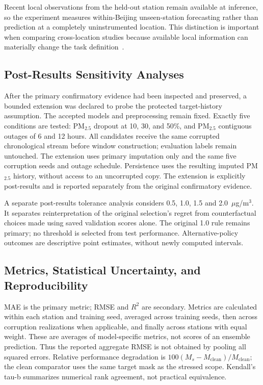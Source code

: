 \documentclass[journal]{IEEEtran}
\begin{document}
Recent local observations from the held-out station remain available at inference, so the experiment measures within-Beijing unseen-station forecasting rather than prediction at a completely uninstrumented location. This distinction is important when comparing cross-location studies because available local information can materially change the task definition~\cite{alvaradoalcon2026citywide}.

\subsection{Post-Results Sensitivity Analyses}
After the primary confirmatory evidence had been inspected and preserved, a bounded extension was declared to probe the protected target-history assumption. The accepted models and preprocessing remain fixed. Exactly five conditions are tested: PM$_{2.5}$ dropout at 10, 30, and 50\%, and PM$_{2.5}$ contiguous outages of 6 and 12 hours. All candidates receive the same corrupted chronological stream before window construction; evaluation labels remain untouched. The extension uses primary imputation only and the same five corruption seeds and outage schedule. Persistence uses the resulting imputed PM$_{2.5}$ history, without access to an uncorrupted copy. The extension is explicitly post-results and is reported separately from the original confirmatory evidence.

A separate post-results tolerance analysis considers 0.5, 1.0, 1.5 and 2.0~$\mu$g/m$^3$. It separates reinterpretation of the original selection's regret from counterfactual choices made using saved validation scores alone. The original 1.0 rule remains primary; no threshold is selected from test performance. Alternative-policy outcomes are descriptive point estimates, without newly computed intervals.

\subsection{Metrics, Statistical Uncertainty, and Reproducibility}
MAE is the primary metric; RMSE and $R^2$ are secondary. Metrics are calculated within each station and training seed, averaged across training seeds, then across corruption realizations when applicable, and finally across stations with equal weight. These are averages of model-specific metrics, not scores of an ensemble prediction. Thus the reported aggregate RMSE is not obtained by pooling all squared errors. Relative performance degradation is $100(M_s-M_{\mathrm{clean}})/M_{\mathrm{clean}}$; the clean comparator uses the same target mask as the stressed scope. Kendall's tau-b summarizes numerical rank agreement, not practical equivalence.
\end{document}
